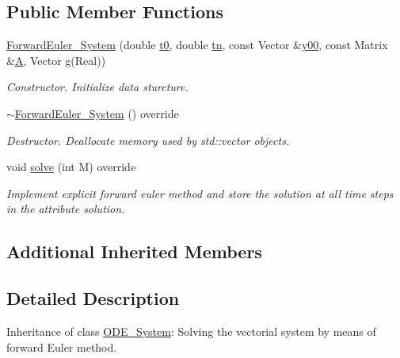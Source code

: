 \subsection*{Public Member Functions}
\begin{DoxyCompactItemize}
\item 
\mbox{\label{class_forward_euler___system_a346bc0f2ebda791edd4cea34761cc7f7}} 
\mbox{\hyperlink{class_forward_euler___system_a346bc0f2ebda791edd4cea34761cc7f7}{Forward\+Euler\+\_\+\+System}} (double \mbox{\hyperlink{class_o_d_e___system_a1947b357608babc98c5e79d645e24c3c}{t0}}, double \mbox{\hyperlink{class_o_d_e___system_a5c5a0dd9f04dfb8d8a84d49b741773af}{tn}}, const Vector \&\mbox{\hyperlink{class_o_d_e___system_a1379137a4480e5861fd1911bc061f908}{y00}}, const Matrix \&\mbox{\hyperlink{class_o_d_e___system_a632009677e80b62a1996e842398bf8b6}{A}}, Vector \mbox{\hyperlink{class_o_d_e___system_a2dee2a4b3468547c3ddab15edfc8ddfd}{g}}(Real))
\begin{DoxyCompactList}\small\item\em Constructor. Initialize data sturcture. \end{DoxyCompactList}\item 
\mbox{\label{class_forward_euler___system_a97a3dd10d62f962b537ac616e84463a5}} 
\mbox{\hyperlink{class_forward_euler___system_a97a3dd10d62f962b537ac616e84463a5}{$\sim$\+Forward\+Euler\+\_\+\+System}} () override
\begin{DoxyCompactList}\small\item\em Destructor. Deallocate memory used by std\+::vector objects. \end{DoxyCompactList}\item 
void \mbox{\hyperlink{class_forward_euler___system_a52532a83a016d8478a7c458881b214b4}{solve}} (int M) override
\begin{DoxyCompactList}\small\item\em Implement explicit forward euler method and store the solution at all time steps in the attribute solution. \end{DoxyCompactList}\end{DoxyCompactItemize}
\subsection*{Additional Inherited Members}


\subsection{Detailed Description}
Inheritance of class \mbox{\hyperlink{class_o_d_e___system}{O\+D\+E\+\_\+\+System}}\+: Solving the vectorial system by means of forward Euler method. 


